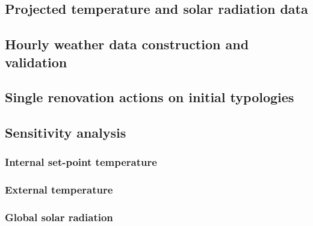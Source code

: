 \documentclass[11pt]{article}
\begin{document}
    \subsection{Projected temperature and solar radiation data} %
    \label{sub:projected_temperature_and_solar_radiation_data}
    

    \subsection{Hourly weather data construction and validation} %
    \label{sub:details_and_justification_of_sin}
    
    

    \subsection{Single renovation actions on initial typologies} %
    \label{sub:single_renovation_actions_on_initial_typologies}
    

    \subsection{Sensitivity analysis} %
    \label{sub:sensitivity_analysis}
        
        \subsubsection{Internal set-point temperature} %
        \label{ssub:internal_set_point_temperature}
        

        \subsubsection{External temperature} %
        \label{ssub:external_temperature}
        

        \subsubsection{Global solar radiation} %
        \label{ssub:global_solar_radiation}
        


\end{document}
